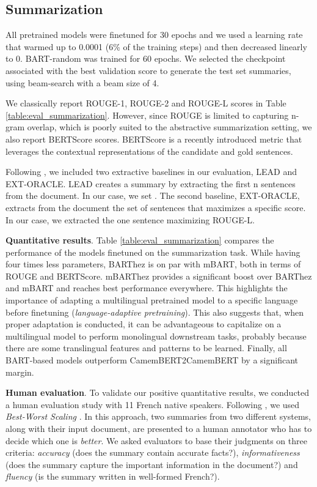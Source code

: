 \documentclass[11pt,a4paper]{article}
\begin{document}
\subsection{Summarization}
All pretrained models were finetuned for 30 epochs and we used a learning rate that warmed up to 0.0001 (6\% of the training steps) and then decreased linearly to 0. BART-random was trained for 60 epochs.
We selected the checkpoint associated with the best validation score to generate the test set summaries, using beam-search with a beam size of 4.

We classically report ROUGE-1, ROUGE-2 and ROUGE-L scores \cite{lin2004rouge} in Table \ref{table:eval_summarization}.
However, since ROUGE is limited to capturing n-gram overlap, which is poorly suited to the abstractive summarization setting, we also report BERTScore scores.
BERTScore \cite{zhang2019bertscore} is a recently introduced metric that leverages the contextual representations of the candidate and gold sentences. 

Following \citet{narayan2018don}, we included two extractive baselines in our evaluation, \textsc{LEAD} and \textsc{EXT-ORACLE}.
\textsc{LEAD} creates a summary by extracting the first n sentences from the document.
In our case, we set .
The second baseline, EXT-ORACLE, extracts from the document the set of sentences that maximizes a specific score. In our case, we extracted the one sentence maximizing ROUGE-L.

\noindent \textbf{Quantitative results}.
Table \ref{table:eval_summarization} compares the performance of the models finetuned on the summarization task.
While having four times less parameters, BARThez is on par with mBART, both in terms of ROUGE and BERTScore.
mBARThez provides a significant boost over BARThez and mBART and reaches best performance everywhere.
This highlights the importance of adapting a multilingual pretrained model to a specific language before finetuning (\textit{language-adaptive pretraining}).
This also suggests that, when proper adaptation is conducted, it can be advantageous to capitalize on a multilingual model to perform monolingual downstream tasks, probably because there are some translingual features and patterns to be learned.
Finally, all BART-based models outperform CamemBERT2CamemBERT by a significant margin.

\noindent \textbf{Human evaluation}.
To validate our positive quantitative results, we conducted a human evaluation study with 11 French native speakers.
Following \citet{narayan2018don}, we used \textit{Best-Worst Scaling} \cite{louviere2015best}.
In this approach, two summaries from two different systems, along with their input document, are presented to a human annotator who has to decide which one is \textit{better}.
We asked evaluators to base their judgments on three criteria: \textit{accuracy} (does the summary contain accurate facts?), \textit{informativeness} (does the summary capture the important information in the document?) and \textit{fluency} (is the summary written in well-formed French?).
\end{document}
